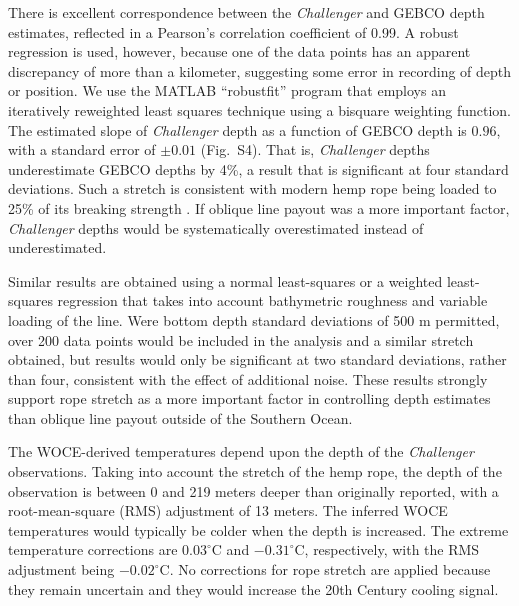\documentclass[12pt]{article}
\begin{document}
There is excellent correspondence between the {\it Challenger} and GEBCO depth
estimates, reflected in a Pearson's correlation coefficient of 0.99.
A robust regression is used, however, because one of the data points
has an apparent discrepancy of more than a kilometer, suggesting some
error in recording of depth or position.  We use the MATLAB ``robustfit''
program that employs an iteratively reweighted least squares technique
using a bisquare weighting function.  The estimated slope of
{\it Challenger} depth as a function of GEBCO depth is $0.96$, with a
standard error of $\pm 0.01$ (Fig.~S4).  That is, {\it Challenger} depths
underestimate GEBCO depths by 4\%, a result that is significant at
four standard deviations.  Such a stretch is consistent with modern
hemp rope being loaded to 25\% of its breaking strength
\cite{McKenna-Hearle-2004:Handbook}.  If oblique line payout was a
more important factor, {\it Challenger} depths would be systematically
overestimated instead of underestimated.

Similar results are obtained using a normal least-squares or a
weighted least-squares regression that takes into account bathymetric
roughness and variable loading of the line.  Were bottom depth
standard deviations of 500 m permitted, over 200 data points would be
included in the analysis and a similar stretch obtained, but results
would only be significant at two standard deviations, rather than four, consistent with the effect of additional noise.  These results
strongly support rope stretch as a more important factor in
controlling depth estimates than oblique line payout outside of the Southern Ocean.



The WOCE-derived temperatures depend upon the depth of the {\it Challenger} observations. Taking into account the stretch of the hemp rope, the depth of the observation is between 0 and 219 meters deeper than originally reported, with a root-mean-square (RMS) adjustment of 13 meters. The inferred WOCE temperatures would typically be colder when the depth is increased. The extreme temperature corrections are $0.03^{\circ}$C and $-0.31^{\circ}$C, respectively, with the RMS adjustment being $-0.02^{\circ}$C. No corrections for rope stretch are applied because they remain uncertain and they would increase the 20th Century cooling signal.

\end{document}
